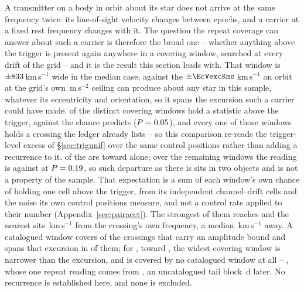 A transmitter on a body in orbit about its star does not arrive at the same
frequency twice: its line-of-sight velocity changes between epochs, and a
carrier at a fixed rest frequency changes with it. The question the repeat
coverage can answer about such a carrier is therefore the broad one --
whether anything above the trigger is present again anywhere in a covering
window, searched at every drift of the grid -- and it is the result this
section leads with. That window is $\pm833$\,km\,s$^{-1}$ wide in the
median case, against the $\pm\EcVexcKms$\,km\,s$^{-1}$ an orbit at the grid's
own \WdAGrid\,m\,s$^{-2}$ ceiling can produce about any star in this sample,
whatever its eccentricity and orientation, so it spans the excursion such a
carrier could have made. \WuNWinExc{} of the \WuNWin{} distinct covering windows hold a
statistic above the trigger, against the \WuExpWin{} chance predicts
($P=0.05$), and every one of those \WuNWinExc{} windows holds a
crossing the ledger already lists -- so this comparison re-reads the
trigger-level excess of \S\ref{sec:trigunif} over the same control positions
rather than adding a recurrence to it. \WuNWinExcTwo{} of the
\WuNWinExc{} are toward \WuTwoStars{} alone; over the remaining
\WuNWinRest{} windows the reading is \WuNWinRestExc{} against
\WuExpRest{} at $P=0.19$, so such departure as there is sits in two
objects and is not a property of the sample. That expectation is a sum of each
window's own
chance of holding one cell above the trigger, from its independent
channel--drift cells and the noise its own control positions measure, and
not a control rate applied to their number (Appendix~\ref{sec:pairacct}). The strongest of them reaches
\WdExcMax{} and the nearest sits \WdNearKms\,km\,s$^{-1}$ from the crossing's
own frequency, a median \WdMedKms\,km\,s$^{-1}$ away. A catalogued window
covers \WdNOrbTot{} of the \RcNExcl{} crossings that carry an amplitude
bound and spans that excursion in \EcNSpan{} of them; for \EcNShort, toward
\EcShortStarList, the widest covering window is narrower than the excursion,
and \WdNNoCov{} is covered by no catalogued window at all -- \WdNoCovStar,
whose one repeat reading comes from \texttt{\WdNoCovEb}, an uncatalogued
tail block \WdNoCovSepD\,d later. No recurrence
is established here, and none is excluded.

